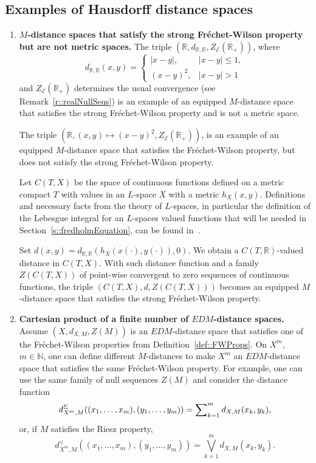 \documentclass[12pt]{amsart}          %
\newcommand{\RR}{\mathbb R}
\newcommand{\NN}{\mathbb N}
\newcommand{\EE}{\mathcal{E}}
\begin{document}
\subsection{Examples of Hausdorff distance spaces}\label{s::examples}

\begin{enumerate}[wide]
\item\label{ex::strongFWIsNotEquivalent} {\bf $M$-distance spaces that satisfy the strong Fr\'{e}chet-Wilson property but are not metric spaces.}
The triple $(\mathbb{R}, d_{\mathbb{R},\mathbb{R}}, Z_{\EE}(\RR_+))$, where
$$
    d_{\RR,\RR}(x,y) =
    \begin{cases}
     |x-y|,& |x-y|\leq 1,\\
     (x-y)^2, & |x-y|>1
    \end{cases}
$$
{and $Z_{\EE}(\RR_+)$ determines the usual convergence (see Remark~\ref{r::realNullSeqs})}
is an example of an equipped $M$-distance space that satisfies the strong Fr\'{e}chet-Wilson property and is not a metric space.

The triple $(\mathbb{R}, (x,y)\mapsto (x-y)^2, Z_{\EE}(\RR_+))$, 
is an example of an equipped $M$-distance space that satisfies the  Fr\'{e}chet-Wilson property, but does not satisfy the strong Fr\'{e}chet-Wilson property.

 Let $C(T ,X)$ be the space of continuous functions defined on a metric compact $T$ with values in an $L$-space $X$ with a metric $h_X(x, y)$.
Definitions and necessary facts from the theory of $L$-spaces, in particular the definition of the Lebesgue integral for an $L$-spaces valued functions that will be needed in Section~\ref{s::fredholmEquation},  can be found in~\cite{Vahrameev, Babenko20}.

Set  
$d(x,y)=d_{\RR,\RR}(h_X(x(\cdot), y(\cdot)), 0)$. We obtain a  $C(T,\mathbb{R})$-valued distance in $C(T ,X)$. With such distance function {and a family $Z(C(T,X))$ of point-wise convergent to zero sequences of continuous functions, the triple $(C(T ,X), d, Z(C(T,X)))$} becomes an equipped $M$-distance space that satisfies the strong Fr\'{e}chet-Wilson property.
    
 \item\label{ex::CartesianProducts}   {\bf Cartesian product of a finite number of $EDM$-distance spaces.} 
 Assume $(X,d_{X,M}, Z(M))$ is an $EDM$-distance space that satisfies one of the  Fr\'{e}chet-Wilson properties from Definition~\ref{def::FWProps}. 
 On $X^m$, $m\in\NN$, one can define different  $M$-distances to make $X^m$ an $EDM$-distance space that satisfies the same Fr\'{e}chet-Wilson property. For example, one can use the same family of null sequences $Z(M)$ and consider the distance function
$$
d_{X^m,M}^\Sigma((x_1,\ldots,x_m),(y_1,\ldots,y_m))=\sum\nolimits\nolimits_{k=1}^md_{X,M}(x_k,y_k),
$$
or, if $M$ satisfies the Riesz property,
$$
d_{X^m,M}^\vee((x_1,\ldots,x_m),(y_1,\ldots,y_m))=\bigvee_{k=1}^md_{X,M}(x_k,y_k).
$$
    

\end{enumerate}
\end{document}
